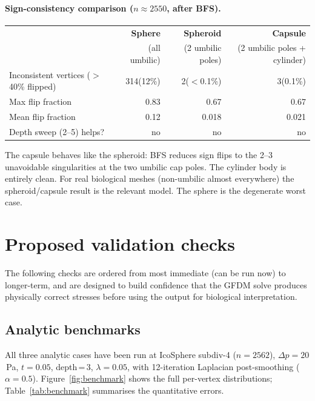 \documentclass[11pt]{article}
\begin{document}
\paragraph{Sign-consistency comparison ($n\approx2550$, after BFS).}

\begin{center}
\begin{tabular}{lrrr}
\toprule
 & \textbf{Sphere} & \textbf{Spheroid} & \textbf{Capsule} \\
 & (all umbilic)   & (2 umbilic poles) & (2 umbilic poles + cylinder) \\
\midrule
Inconsistent vertices ($>$40\% flipped) & 314\;(12\%) & 2\;($<$0.1\%) & 3\;(0.1\%) \\
Max flip fraction                        & 0.83 & 0.67 & 0.67 \\
Mean flip fraction                       & 0.12 & 0.018 & 0.021 \\
Depth sweep (2--5) helps?               & no & no & no \\
\bottomrule
\end{tabular}
\end{center}

The capsule behaves like the spheroid: BFS reduces sign flips to the 2--3
unavoidable singularities at the two umbilic cap poles.  The cylinder body is
entirely clean.  For real biological meshes (non-umbilic almost everywhere) the
spheroid/capsule result is the relevant model.  The sphere is the degenerate
worst case.

\section{Proposed validation checks}
\label{sec:validation-checks}

The following checks are ordered from most immediate (can be run now) to
longer-term, and are designed to build confidence that the GFDM solve
produces physically correct stresses before using the output for
biological interpretation.

\subsection{Analytic benchmarks}
\label{sec:benchmarks}

All three analytic cases have been run at IcoSphere subdiv-4 ($n=2562$),
$\Delta p=20$\,Pa, $t=0.05$, depth\,=\,3, $\lambda=0.05$, with 12-iteration
Laplacian post-smoothing ($\alpha=0.5$).
Figure~\ref{fig:benchmark} shows the full per-vertex distributions;
Table~\ref{tab:benchmark} summarises the quantitative errors.
\end{document}
